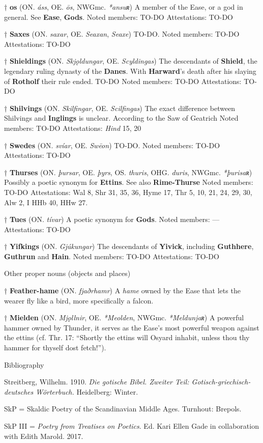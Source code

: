 † \textbf{os} (ON. \emph{áss}, OE. \emph{ōs}, NWGmc. \emph{*ansuʀ})
 A member of the Ease, or a god in general. See \textbf{Ease}, \textbf{Gods}.
 Noted members: TO-DO
 Attestations: TO-DO

† \textbf{Saxes} (ON. \emph{saxar}, OE. \emph{Seaxan}, \emph{Seaxe})
 TO-DO.
 Noted members: TO-DO
 Attestations: TO-DO

† \textbf{Shieldings} (ON. \emph{Skjǫldungar}, OE. \emph{Scyldingas})
 The descendants of \textbf{Shield}, the legendary ruling dynasty of the \textbf{Danes}. With \textbf{Harward}'s death after his slaying of \textbf{Rotholf} their rule ended. TO-DO
 Noted members: TO-DO
 Attestations: TO-DO

† \textbf{Shilvings} (ON. \emph{Skilfingar}, OE. \emph{Scilfingas})
 The exact difference between Shilvings and \textbf{Inglings} is unclear. According to the Saw of Geatrich
 Noted members: TO-DO
 Attestations: \emph{Hind} 15, 20

† \textbf{Swedes} (ON. \emph{svíar}, OE. \emph{Swēon})
 TO-DO.
 Noted members: TO-DO
 Attestations: TO-DO

† \textbf{Thurses} (ON. \emph{þursar}, OE. \emph{þyrs}, OS. \emph{thuris}, OHG. \emph{duris}, NWGmc. \emph{*þurisaʀ})
 Possibly a poetic synonym for \textbf{Ettins}. See also \textbf{Rime-Thurse}
 Noted members: TO-DO
 Attestations: Wal 8, Shr 31, 35, 36, Hyme 17, Thr 5, 10, 21, 24, 29, 30, Alw 2, I HHb 40, HHw 27.
 
 † \textbf{Tues} (ON. \emph{tívar})
 A poetic synonym for \textbf{Gods}.
 Noted members: —
 Attestations: TO-DO

† \textbf{Yifkings} (ON. \emph{Gjúkungar})
 The descendants of \textbf{Yivick}, including \textbf{Guthhere}, \textbf{Guthrun} and \textbf{Hain}.
 Noted members: TO-DO
 Attestations: TO-DO



Other proper nouns (objects and places)

† \textbf{Feather-hame} (ON. \emph{fjaðrhamr})
 A \emph{hame} owned by the Ease that lets the wearer fly like a bird, more specifically a falcon.

† \textbf{Mielden} (ON. \emph{Mjǫllnir}, OE. \emph{*Meolden}, NWGmc. \emph{*Meldunjaʀ})
 A powerful hammer owned by Thunder, it serves as the Ease’s most powerful weapon against the ettins (cf. Thr. 17: “Shortly the ettins will Osyard inhabit, unless thou thy hammer for thyself dost fetch!”).



Bibliography

Streitberg, Wilhelm. 1910. \emph{Die gotische Bibel. Zweiter Teil: Gotisch-griechisch-deutsches Wörterbuch.} Heidelberg: Winter.

SkP = Skaldic Poetry of the Scandinavian Middle Ages. Turnhout: Brepols.

SkP III = \emph{Poetry from Treatises on Poetics}. Ed. Kari Ellen Gade in collaboration with Edith Marold. 2017.

